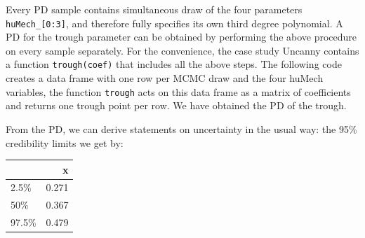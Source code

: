 \documentclass[]{svmono}
\newenvironment{Shaded}{\begin{snugshade}}{\end{snugshade}}
\newcommand{\KeywordTok}[1]{\textcolor[rgb]{0.13,0.29,0.53}{\textbf{#1}}}
\newcommand{\DataTypeTok}[1]{\textcolor[rgb]{0.13,0.29,0.53}{#1}}
\newcommand{\DecValTok}[1]{\textcolor[rgb]{0.00,0.00,0.81}{#1}}
\newcommand{\FloatTok}[1]{\textcolor[rgb]{0.00,0.00,0.81}{#1}}
\newcommand{\StringTok}[1]{\textcolor[rgb]{0.31,0.60,0.02}{#1}}
\newcommand{\OperatorTok}[1]{\textcolor[rgb]{0.81,0.36,0.00}{\textbf{#1}}}
\newcommand{\NormalTok}[1]{#1}
\theoremstyle{definition}
\theoremstyle{definition}
\theoremstyle{definition}
\theoremstyle{remark}
\begin{document}
Every PD sample contains simultaneous draw of the four parameters
\texttt{huMech\_{[}0:3{]}}, and therefore fully specifies its own third
degree polynomial. A PD for the trough parameter can be obtained by
performing the above procedure on every sample separately. For the
convenience, the case study Uncanny contains a function
\texttt{trough(coef)} that includes all the above steps. The following
code creates a data frame with one row per MCMC draw and the four huMech
variables, the function \texttt{trough} acts on this data frame as a
matrix of coefficients and returns one trough point per row. We have
obtained the PD of the trough.

\begin{Shaded}
\end{Shaded}

From the PD, we can derive statements on uncertainty in the usual way:
the 95\% credibility limits we get by:

\begin{Shaded}
\end{Shaded}

\begin{tabular}{l|r}
\hline
  & x\\
\hline
2.5\% & 0.271\\
\hline
50\% & 0.367\\
\hline
97.5\% & 0.479\\
\hline
\end{tabular}
\end{document}

